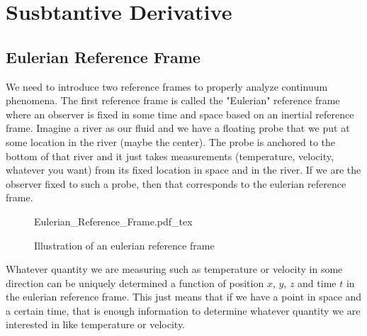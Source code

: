 \chapter{Susbtantive Derivative}
\begin{comment}
\end{comment}



\section{Eulerian Reference Frame}
\begin{comment}
\end{comment}
We need to introduce two reference frames to properly analyze continuum phenomena. 
The first reference frame is called the "Eulerian" reference frame where an observer is fixed in some time and space based on an inertial reference frame.
Imagine a river as our fluid and we have a floating probe that we put at some location in the river (maybe the center).
The probe is anchored to the bottom of that river and it just takes measurements (temperature, velocity, whatever you want) from its fixed location in space and in the river.
If we are the observer fixed to such a probe, then that corresponds to the eulerian reference frame.
\begin{figure}[H]\centering
\def\svgwidth{500px}
{Eulerian_Reference_Frame.pdf_tex}
\caption{Illustration of an eulerian reference frame}
\label{eulerian reference frame fluid}
\end{figure}
Whatever quantity we are measuring such as temperature or velocity in some direction can be uniquely determined a function of position $x$, $y$, $z$ and time $t$ in the eulerian reference frame.
This just means that if we have a point in space and a certain time, that is enough information to determine whatever quantity we are interested in like temperature or velocity.

